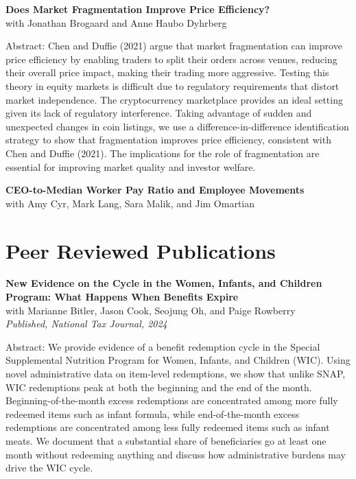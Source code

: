 \documentclass[11pt]{article}
\newcommand{\cvsection}[2][12]{%
\Needspace{#1\baselineskip}%
\section*{#2}%
}
\newenvironment{paperentry}{%
\Needspace{24\baselineskip}%
\samepage
}{%
\vspace{0.6em}%
\par
}
\begin{document}
\begin{paperentry}
\textbf{Does Market Fragmentation Improve Price Efficiency?}\\
with Jonathan Brogaard and Anne Haubo Dyhrberg

Abstract: Chen and Duffie (2021) argue that market fragmentation can improve price efficiency by enabling traders to split their orders across venues, reducing their overall price impact, making their trading more aggressive. Testing this theory in equity markets is difficult due to regulatory requirements that distort market independence. The cryptocurrency marketplace provides an ideal setting given its lack of regulatory interference. Taking advantage of sudden and unexpected changes in coin listings, we use a difference-in-difference identification strategy to show that fragmentation improves price efficiency, consistent with Chen and Duffie (2021). The implications for the role of fragmentation are essential for improving market quality and investor welfare.
\end{paperentry}

\begin{paperentry}
\textbf{CEO-to-Median Worker Pay Ratio and Employee Movements}\\
with Amy Cyr, Mark Lang, Sara Malik, and Jim Omartian
\end{paperentry}

\cvsection{Peer Reviewed Publications}
\begin{paperentry}
\textbf{New Evidence on the Cycle in the Women, Infants, and Children Program: What Happens When Benefits Expire}\\
with Marianne Bitler, Jason Cook, Seojung Oh, and Paige Rowberry\\
\emph{Published, National Tax Journal, 2024}

Abstract: We provide evidence of a benefit redemption cycle in the Special Supplemental Nutrition Program for Women, Infants, and Children (WIC). Using novel administrative data on item-level redemptions, we show that unlike SNAP, WIC redemptions peak at both the beginning and the end of the month. Beginning-of-the-month excess redemptions are concentrated among more fully redeemed items such as infant formula, while end-of-the-month excess redemptions are concentrated among less fully redeemed items such as infant meats. We document that a substantial share of beneficiaries go at least one month without redeeming anything and discuss how administrative burdens may drive the WIC cycle.
\end{paperentry}
\end{document}
